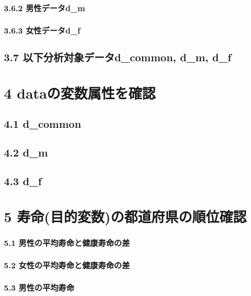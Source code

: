 \subsection{3.6.2 男性データd\_m}


\subsection{3.6.3 女性データd\_f}



\section{3.7 以下分析対象データd\_common, d\_m, d\_f}




\chapter{4 dataの変数属性を確認}

\section{4.1 d\_common}

\section{4.2 d\_m}

\section{4.3 d\_f}



\chapter{5 寿命(目的変数)の都道府県の順位確認}




\subsection{5.1 男性の平均寿命と健康寿命の差}

\subsection{5.2 女性の平均寿命と健康寿命の差}


\subsection{5.3 男性の平均寿命}


